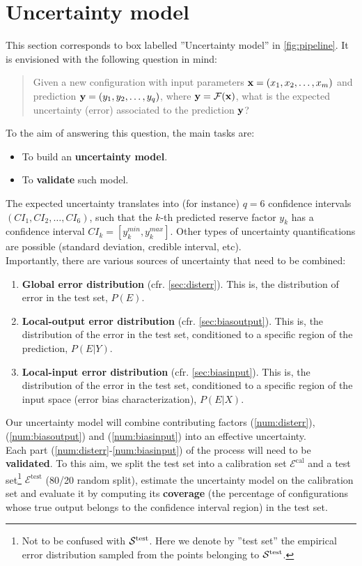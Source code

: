\section{Uncertainty model}\label{sec:uncertainty}
This section corresponds to box labelled ''Uncertainty model'' in \autoref{fig:pipeline}. It is envisioned with the following question in mind:
\begin{quotation}
	Given a new configuration with input parameters ${\bf x}=(x_1,x_2,\dots,x_m)$ and prediction ${\bf y}=(y_1,y_2,\dots,y_q)$, where ${\bf y}=\mathcal{F}({\bf x})$, what is the expected uncertainty (error) associated to the prediction $\bf y$?
\end{quotation}
%
To the aim of answering this question, the main tasks are:
\begin{itemize}
	\item To build an \textbf{uncertainty model}.
	\item To \textbf{validate} such model.\\
\end{itemize}
%
\indent The expected uncertainty translates into (for instance) $q=6$ confidence intervals $(CI_{1},CI_{2},\dots,CI_{6})$, such that the $k$-th predicted reserve factor $y_k$ has a confidence interval $CI_k=[y_k^{min},y_k^{max}]$. Other types of uncertainty quantifications are possible (standard deviation, credible interval, etc).\\
%
\indent Importantly, there are various sources of uncertainty that need to be combined:
\begin{enumerate}
	\item \textbf{Global error distribution} (cfr. \autoref{sec:disterr}). This is, the distribution of error in the test set, $P(E)$.\label{num:disterr}
	\item \textbf{Local-output error distribution} (cfr. \autoref{sec:biasoutput}). This is, the distribution of the error in the test set, conditioned to a specific region of the prediction, $P(E|{Y})$.\label{num:biasoutput}
	\item \textbf{Local-input error distribution} (cfr. \autoref{sec:biasinput}). This is, the distribution of the error in the test set, conditioned to a specific region of the input space (error bias characterization), $P(E|{X})$.\label{num:biasinput}\\
\end{enumerate}
%
\indent Our uncertainty model will combine contributing factors (\ref{num:disterr}), (\ref{num:biasoutput}) and (\ref{num:biasinput}) into an effective uncertainty.\\
%
\indent Each part (\ref{num:disterr}-\ref{num:biasinput}) of the process will need to be \textbf{validated}. To this aim, we split the test set into a calibration set $\mathcal{E}^\text{cal}$ and a test set\footnote{Not to be confused with $\cal{S}^\text{test}$. Here we denote by ''test set'' the empirical error distribution sampled from the points belonging to $\cal{S}^\text{test}$.} $\mathcal{E}^\text{test}$ (80/20 random split), estimate the uncertainty model on the calibration set and evaluate it by computing its \textbf{coverage} (\ie the percentage of configurations whose true output belongs to the confidence interval region) in the test set.\\
